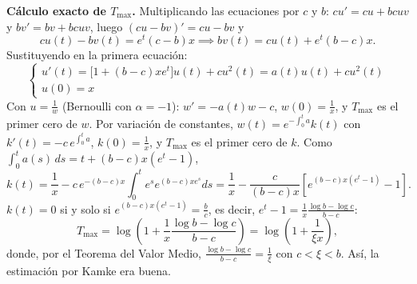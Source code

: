 {    \textbf{Cálculo exacto de $T_{\max}$.} Multiplicando las ecuaciones por $c$ y $b$: $c u' = c u + b c u v$ y $b v' = b v + b c u v$, luego $(c u - b v)' = c u - b v$ y
    \[
        c u(t) - b v(t) = e^t (c - b) x \implies b v(t) = c u(t) + e^t (b - c) x.
    \]
    Sustituyendo en la primera ecuación:
    \[
        \begin{cases}
            u'(t) = \bigl[ 1 + (b - c) x e^t \bigr] u(t) + c u^2(t) = a(t) u(t) + c u^2(t) \\
            u(0) = x
        \end{cases}
    \]
    Con $u = \frac{1}{w}$ (Bernoulli con $\alpha = -1$): $w' = -a(t) w - c$, $w(0) = \frac{1}{x}$, y $T_{\max}$ es el primer cero de $w$. Por variación de constantes, $w(t) = e^{-\int_0^t a} k(t)$ con $k'(t) = -c \, e^{\int_0^t a}$, $k(0) = \frac{1}{x}$, y $T_{\max}$ es el primer cero de $k$. Como $\int_0^t a(s) \, ds = t + (b - c) x (e^t - 1)$,
    \[
        k(t) = \frac{1}{x} - c \, e^{-(b - c) x} \int_0^t e^s e^{(b - c) x e^s} ds
        = \frac{1}{x} - \frac{c}{(b - c) x} \left[ e^{(b - c) x (e^t - 1)} - 1 \right].
    \]
    $k(t) = 0$ si y solo si $e^{(b - c) x (e^t - 1)} = \frac{b}{c}$, es decir, $e^t - 1 = \frac{1}{x} \frac{\log b - \log c}{b - c}$:
    \[
        T_{\max} = \log \left( 1 + \frac{1}{x} \frac{\log b - \log c}{b - c} \right) = \log \left( 1 + \frac{1}{\xi x} \right),
    \]
    donde, por el Teorema del Valor Medio, $\frac{\log b - \log c}{b - c} = \frac{1}{\xi}$ con $c < \xi < b$. Así, la estimación por Kamke era buena.
}
